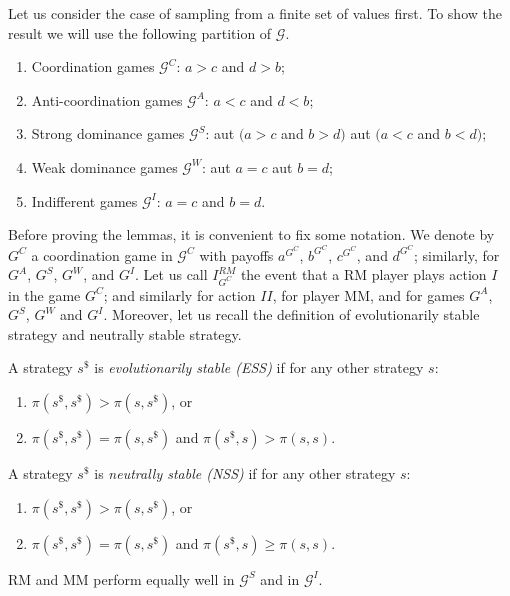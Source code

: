 \documentclass[fleqn,reqno,11pt]{article}
\begin{document}
\noindent Let us consider the case of sampling from a finite set of values first. To show
the result we will use the following partition of $\mathcal{G}$.
\begin{enumerate}
\item Coordination games $\mathcal{G}^{C}$: $a>c$ and $d>b$;
\item Anti-coordination games $\mathcal{G}^{A}$: $a<c$ and $d<b$;
\item Strong dominance games $\mathcal{G}^{S}$: aut $(a>c$ and $b>d)$
aut $(a<c$ and $b<d)$;
\item Weak dominance games $\mathcal{G}^{W}$: aut $a=c$ aut $b=d$;
\item Indifferent games $\mathcal{G}^{I}$: $a=c$ and $b=d$.
\end{enumerate}
Before proving the lemmas, it is convenient to fix some notation.
We denote by $G^{C}$ a coordination game in $\mathcal{G}^{C}$ with
payoffs $a^{G^{C}}$, $b^{G^{C}}$, $c^{G^{C}}$, and $d^{G^{C}}$;
similarly, for $G^{A}$, $G^{S}$, $G^{W}$, and $G^{I}$. Let us
call $I_{G^{C}}^{RM}$ the event that a RM player plays action $I$
in the game $G^{C}$; and similarly for action $II$, for player MM,
and for games $G^{A}$, $G^{S}$, $G^{W}$ and $G^{I}$. Moreover,
let us recall the definition of evolutionarily stable strategy and
neutrally stable strategy.

\medskip{}

\begin{definition}
A strategy $s^{\$}$ is \emph{evolutionarily stable
(ESS)} if for any other strategy $s$:
\begin{enumerate}
\item $\pi(s^{\$},s^{\$})>\pi(s,s^{\$})$, or
\item $\pi(s^{\$},s^{\$})=\pi(s,s^{\$})$ and $\pi(s^{\$},s)>\pi(s,s)$.
\end{enumerate}
\noindent A strategy $s^{\$}$ is \emph{neutrally stable (NSS)} if
for any other strategy $s$:
\begin{enumerate}
\item $\pi(s^{\$},s^{\$})>\pi(s,s^{\$})$, or
\item $\pi(s^{\$},s^{\$})=\pi(s,s^{\$})$ and $\pi(s^{\$},s)\geq\pi(s,s)$.
\end{enumerate}
\end{definition}

\medskip{}

\begin{lemma}
RM and MM perform equally well in $\mathcal{G}^{S}$
and in $\mathcal{G}^{I}$. 
\end{lemma}
\end{document}
